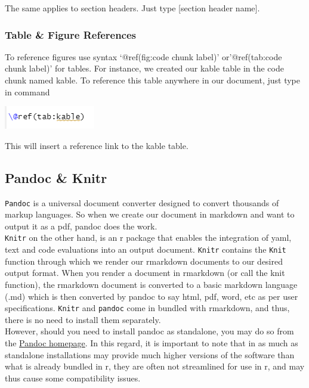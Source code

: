 \documentclass[
]{book}
\let\origfigure\figure
\let\endorigfigure\endfigure
\renewenvironment{figure}[1][2] {
    \expandafter\origfigure\expandafter[H]
} {
    \endorigfigure
}
\begin{document}
The same applies to section headers. Just type {[}section header name{]}.

\hypertarget{table-figure-references}{%
\subsubsection{Table \& Figure References}\label{table-figure-references}}

To reference figures use syntax `@ref(fig:code chunk label)' or'@ref(tab:code chunk label)' for tables.
For instance, we created our kable table in the code chunk named kable. To reference this table anywhere in our document, just type in command

\begin{figure}
\centering
\includegraphics{tutorial_screenshots/ref_table.png}
\caption{Ref table}
\end{figure}

This will insert a reference link to the kable table.

\hypertarget{pandoc-knitr}{%
\subsection{Pandoc \& Knitr}\label{pandoc-knitr}}

\texttt{Pandoc} is a universal document converter designed to convert thousands of markup languages. So when we create our document in markdown and want to output it as a pdf, pandoc does the work.\\
\texttt{Knitr} on the other hand, is an r package that enables the integration of yaml, text and code evaluations into an output document. \texttt{Knitr} contains the \texttt{Knit} function through which we render our rmarkdown documents to our desired output format.
When you render a document in rmarkdown (or call the knit function), the rmarkdown document is converted to a basic markdown language (.md) which is then converted by pandoc to say html, pdf, word, etc as per user specifications.
\texttt{Knitr} and \texttt{pandoc} come in bundled with rmarkdown, and thus, there is no need to install them separately.\\
However, should you need to install pandoc as standalone, you may do so from the \href{http://pandoc.org}{Pandoc homepage}. In this regard, it is important to note that in as much as standalone installations may provide much higher versions of the software than what is already bundled in r, they are often not streamlined for use in r, and may thus cause some compatibility issues.
\end{document}
